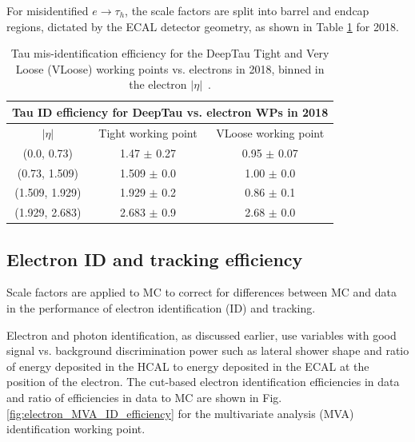 For misidentified $e \rightarrow \tau_{h}$, the scale factors are split into barrel and endcap regions, dictated by the ECAL detector geometry, as shown in Table \ref{table:tauIDeff_deepTau_vs_electron} for 2018.

\begin{table}[ht]
    \centering
    \begin{tabular}{|c|c|c|}
    \hline
    \multicolumn{3}{|c|}{Tau ID efficiency for DeepTau vs. electron WPs in 2018} \\ \hline
    \hline
    $|\eta|$  & Tight working point & VLoose working point \\ \hline
    (0.0, 0.73)     & 1.47 $\pm$ 0.27  & 0.95 $\pm$ 0.07  \\ \hline 
    (0.73, 1.509)   & 1.509 $\pm$ 0.0  & 1.00 $\pm$ 0.0  \\ \hline 
    (1.509, 1.929)  & 1.929 $\pm$ 0.2  & 0.86 $\pm$ 0.1 \\ \hline 
    (1.929, 2.683)  & 2.683 $\pm$ 0.9  & 2.68 $\pm$ 0.0 \\ \hline
    \end{tabular}
    \caption[Tau mis-identification efficiency for the DeepTau Tight and Very Loose (VLoose) working points vs. electrons in 2018.]{Tau mis-identification efficiency for the DeepTau Tight and Very Loose (VLoose) working points vs. electrons in 2018, binned in the electron $|\eta|$~\cite{twiki_TAU_POG_tauidrecommendationforrun2}.}
    \label{table:tauIDeff_deepTau_vs_electron}
\end{table}


\subsection{Electron ID and tracking efficiency}
Scale factors are applied to MC to correct for differences between MC and data in the performance of electron identification (ID) and tracking.

Electron and photon identification, as discussed earlier, use variables with good signal vs. background discrimination power such as lateral shower shape and ratio of energy deposited in the HCAL to energy deposited in the ECAL at the position of the electron. The cut-based electron identification efficiencies in data and ratio of efficiencies in data to MC are shown in Fig. \ref{fig:electron_MVA_ID_efficiency} for the multivariate analysis (MVA) identification working point. 

